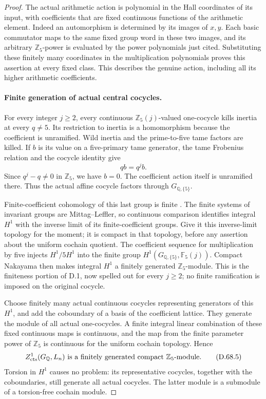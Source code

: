 \begin{proof}
The actual arithmetic action is polynomial in
the Hall coordinates of its input, with coefficients
that are fixed continuous functions of the
arithmetic element. Indeed an automorphism is
determined by its images of \(x,y\). Each basic
commutator maps to the same fixed group word
in these two images, and its arbitrary
\(\mathbb Z_5\)-power is evaluated by the power
polynomials just cited. Substituting these finitely
many coordinates in the multiplication polynomials
proves this assertion at every fixed class.
This describes the genuine action, including
all its higher arithmetic coefficients.

\paragraph{Finite generation of actual central cocycles.}
For every integer \(j\ge2\), every continuous
\(\mathbb Z_5(j)\)-valued one-cocycle kills
inertia at every \(q\ne5\). Its restriction to
inertia is a homomorphism because the coefficient
is unramified. Wild inertia and the prime-to-five
tame factors are killed. If \(b\) is its value
on a five-primary tame generator, the tame
Frobenius relation and the cocycle identity give
\[
                         q b=q^j b.
                                                        \tag{D.68.4}
\]
Since \(q^j-q\ne0\) in \(\mathbb Z_5\), we
have \(b=0\). The coefficient action itself is
unramified there. Thus the actual affine cocycle
factors through \(G_{\mathbb Q,\{5\}}\).

Finite-coefficient cohomology of this last
group is finite
\cite[I, Corollary 4.15]{DE_MilneADT}.
The finite systems of invariant groups are
Mittag--Leffler, so continuous comparison
\cite[Proposition 1.6 and Theorem 2.2]{DE_Jannsen1988}
identifies integral \(H^1\) with the inverse
limit of its finite-coefficient groups. Give it
this inverse-limit topology for the moment; it
is compact in that topology, before any assertion
about the uniform cochain quotient. The coefficient sequence
for multiplication by five injects
\(H^1/5H^1\) into the finite group
\(H^1(G_{\mathbb Q,\{5\}},\mathbb F_5(j))\).
Compact Nakayama then makes integral \(H^1\)
a finitely generated \(\mathbb Z_5\)-module.
This is the finiteness portion of D.1, now
spelled out for every \(j\ge2\); no finite
ramification is imposed on the original cocycle.

Choose finitely many actual continuous cocycles
representing generators of this \(H^1\), and
add the coboundary of a basis of the coefficient
lattice. They generate the module of all actual
one-cocycles. A finite integral linear combination
of these fixed continuous maps is continuous,
and the map from the finite parameter power of
\(\mathbb Z_5\) is continuous for the uniform
cochain topology. Hence
\[
 Z^1_{\rm cts}(G_{\mathbb Q},L_n)
       \text{ is a finitely generated compact }
                          \mathbb Z_5\text{-module}.
                                                        \tag{D.68.5}
\]
Torsion in \(H^1\) causes no problem: its
representative cocycles, together with the
coboundaries, still generate all actual cocycles.
The latter module is a submodule of a torsion-free
cochain module.


\end{proof}
